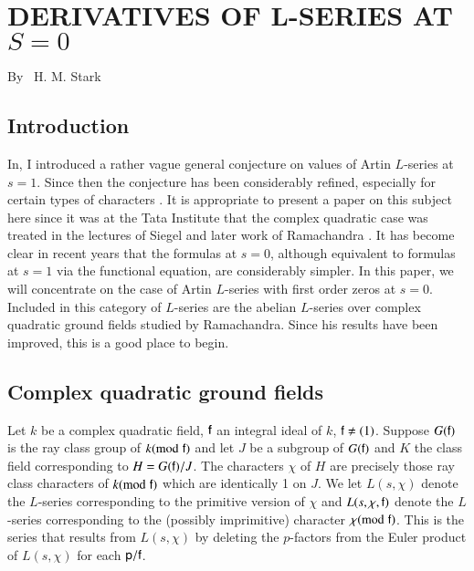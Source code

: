 \chapter{DERIVATIVES OF L-SERIES AT $S=0$}


\begin{center}
{\large By~ H. M. Stark}
\end{center}


\bigskip

\setcounter{pageoriginal}{260}

\section{Introduction}\label{art9-sec1}
In, I introduced \cite{art9-5} a rather vague general conjecture on values of Artin $L$-series at $s =1$. Since then the conjecture has been considerably refined, especially for certain types of characters \cite[II, III, IV]{art9-6}. It is appropriate to present a paper on this subject here since it was at the Tata Institute that the complex quadratic case was treated in the lectures of Siegel \cite{art9-4} and later work of Ramachandra \cite{art9-3}. It has become clear in recent years that the formulas at $s = 0$, although equivalent to formulas at $s =1$ via the functional equation, are considerably simpler. In this paper, we will concentrate on the case of Artin $L$-series with first order zeros at $s =0$. Included in this category of $L$-series are the abelian $L$-series over complex quadratic ground fields studied by Ramachandra. Since his results have been improved, this is a good place to begin.

\section{Complex quadratic ground fields}\label{art8-sec2} 

Let $k$ be a complex quadratic field, $\mathsf{f}$ an integral ideal of $k$, $\mathsf{f} \neq (1)$. Suppose $G(\mathsf{f})$ is the ray class group of $k({\rm{mod}}\kern.3em \mathsf{f})$ and let $J$ be a subgroup of $G(\mathsf{f})$  and $K$ the class field corresponding to $H = G (\mathsf{f})/J$. The characters $\chi$ of $H$ are precisely those ray class characters of $k ({\rm{mod}}\kern.3em \mathsf{f})$ which are identically 1 on $J$. We let $L (s, \chi)$ denote the $L$-series corresponding to the primitive version of $\chi$ and $L(s,\chi, \mathsf{f})$ denote the $L$-series corresponding to the (possibly imprimitive)  character $\chi ({\rm{mod}}\kern.3em \mathsf{f})$. This is the series that results from $L(s, \chi)$ by deleting the $p$-factors from the Euler product of $L(s, \chi)$ for each $\mathsf{p}/\mathsf{f}$.

